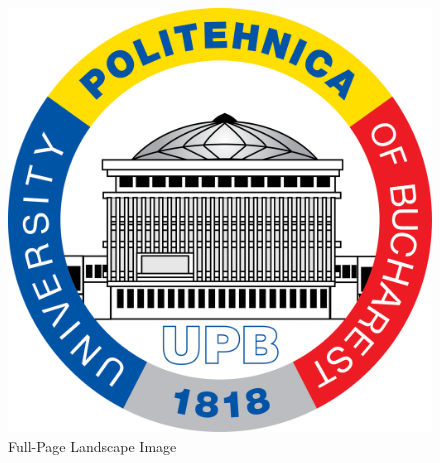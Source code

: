 \documentclass[../main.tex]{subfiles}
\begin{document}
\begin{landscape}
    \begin{figure}[!h]
        \centering
        \includegraphics[height=0.95\textheight]{images/theme/upb.png}
        \caption{Full-Page Landscape Image}
        \label{fig:landscape_image}
    \end{figure}
\end{landscape}
\end{document}
